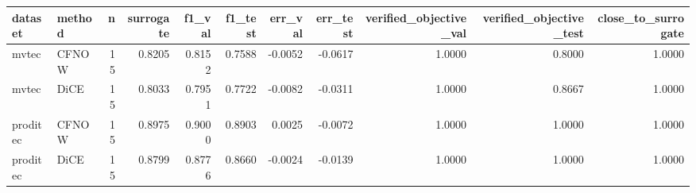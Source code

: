 \begin{tabular}{llrrrrrrrrr}
\toprule
 dataset & method &  n &  surrogate &  f1\_val &  f1\_test &  err\_val &  err\_test &  verified\_objective\_val &  verified\_objective\_test &  close\_to\_surrogate \\
\midrule
   mvtec &  CFNOW & 15 &     0.8205 &  0.8152 &   0.7588 &  -0.0052 &   -0.0617 &                  1.0000 &                   0.8000 &              1.0000 \\
   mvtec &   DiCE & 15 &     0.8033 &  0.7951 &   0.7722 &  -0.0082 &   -0.0311 &                  1.0000 &                   0.8667 &              1.0000 \\
proditec &  CFNOW & 15 &     0.8975 &  0.9000 &   0.8903 &   0.0025 &   -0.0072 &                  1.0000 &                   1.0000 &              1.0000 \\
proditec &   DiCE & 15 &     0.8799 &  0.8776 &   0.8660 &  -0.0024 &   -0.0139 &                  1.0000 &                   1.0000 &              1.0000 \\
\bottomrule
\end{tabular}
